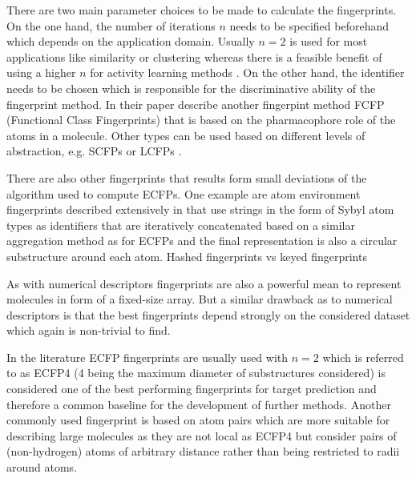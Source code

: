 There are two main parameter choices to be made to calculate the fingerprints. On the one hand, the number of iterations $n$ needs to be specified beforehand which depends on the application domain. Usually $n=2$ is used for most applications like similarity or clustering whereas there is a feasible benefit of using a higher $n$ for activity learning methods \cite{ECFP}.
On the other hand, the identifier needs to be chosen which is responsible for the discriminative  ability of the fingerprint method. In their paper \cite{ECFP} describe another fingerpint method FCFP (Functional Class Fingerprints) that is based on the pharmacophore role of the atoms in a molecule. Other types can be used based on different levels of abstraction, e.g. SCFPs \citep{SCFP} or LCFPs \citep{LCFP}.

There are also other fingerprints that results form small deviations of the algorithm used to compute ECFPs. One example are atom environment fingerprints described extensively in \cite{glen2006circular} that use strings in the form of Sybyl atom types as identifiers \citep{SCFP} that are iteratively concatenated based on a similar aggregation method as for ECFPs and the final representation is also a circular substructure around each atom. 
Hashed fingerprints vs keyed fingerprints

As with numerical descriptors fingerprints are also a powerful mean to represent molecules in form of a fixed-size array. But a similar drawback as to numerical descriptors is that the best fingerprints depend strongly on the considered dataset which again is  non-trivial to find.

In the literature ECFP fingerprints are usually used with $n=2$ which is referred to as ECFP4 (4 being the maximum diameter of substructures considered) is considered one of the best performing fingerprints for target prediction \cite{awaleecfp4} and therefore a common baseline for the development of further methods. Another commonly used fingerprint is based on atom pairs \citep{atompairs} which are more suitable for describing large molecules as they are not local as ECFP4 but consider pairs of (non-hydrogen) atoms of arbitrary distance rather than being restricted to radii around atoms. 

